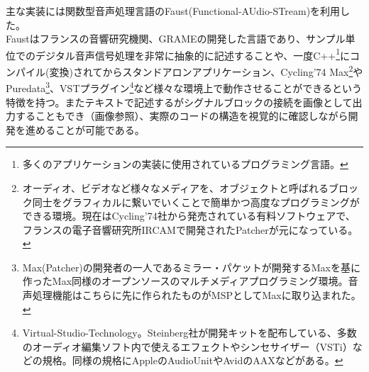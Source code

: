 \documentclass[a4paper,report]{jsbook}
\begin{document}
主な実装には関数型音声処理言語のFaust(Functional-AUdio-STream)を利用した。\\
Faustはフランスの音響研究機関、GRAMEの開発した言語であり、サンプル単位でのデジタル音声信号処理を非常に抽象的に記述することや、一度C++\footnote{多くのアプリケーションの実装に使用されているプログラミング言語。}にコンパイル(変換)されてからスタンドアロンアプリケーション、Cycling'74
Max\footnote{オーディオ、ビデオなど様々なメディアを、オブジェクトと呼ばれるブロック同士をグラフィカルに繋いでいくことで簡単かつ高度なプログラミングができる環境。現在はCycling'74社から発売されている有料ソフトウェアで、フランスの電子音響研究所IRCAMで開発されたPatcherが元になっている。}やPuredata\footnote{Max(Patcher)の開発者の一人であるミラー・パケットが開発するMaxを基に作ったMax同様のオープンソースのマルチメディアプログラミング環境。音声処理機能はこちらに先に作られたものがMSPとしてMaxに取り込まれた。}、VSTプラグイン\footnote{Virtual-Studio-Technology。Steinberg社が開発キットを配布している、多数のオーディオ編集ソフト内で使えるエフェクトやシンセサイザー（VSTi）などの規格。同様の規格にAppleのAudioUnitやAvidのAAXなどがある。}など様々な環境上で動作させることができるという特徴を持つ。またテキストで記述するがシグナルブロックの接続を画像として出力することもでき（画像参照）、実際のコードの構造を視覚的に確認しながら開発を進めることが可能である。
\end{document}
